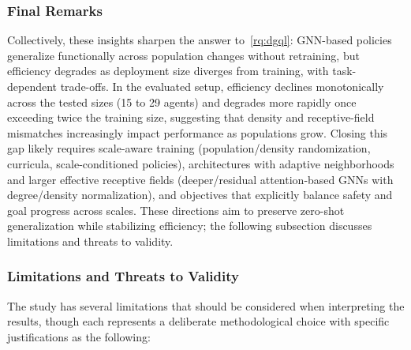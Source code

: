 \subsubsection{Final Remarks}
Collectively, 
 these insights sharpen the answer to~\ref{rq:dgql}: 
 GNN-based policies generalize functionally across population changes without retraining,
 but efficiency degrades as deployment size diverges from training, with task-dependent trade-offs. 
%
In the evaluated setup, 
 efficiency declines monotonically across the tested sizes (15 to 29 agents) 
 and degrades more rapidly once exceeding twice the training size, 
 suggesting that density and receptive-field mismatches increasingly impact performance as populations grow. 
% 
Closing this gap likely requires scale-aware training 
 (population/density randomization, curricula, scale-conditioned policies), 
 architectures with adaptive neighborhoods and larger effective receptive fields 
 (deeper/residual attention-based GNNs with degree/density normalization), 
 and objectives that explicitly balance safety and goal progress across scales.
%
These directions aim to preserve zero-shot generalization while stabilizing efficiency; 
 the following subsection discusses limitations and threats to validity.

\subsubsection{Limitations and Threats to Validity}
\label{subsec:limitations}
The study has several limitations that should be considered when interpreting the results,
 though each represents a deliberate methodological choice with specific justifications 
 as the following:

